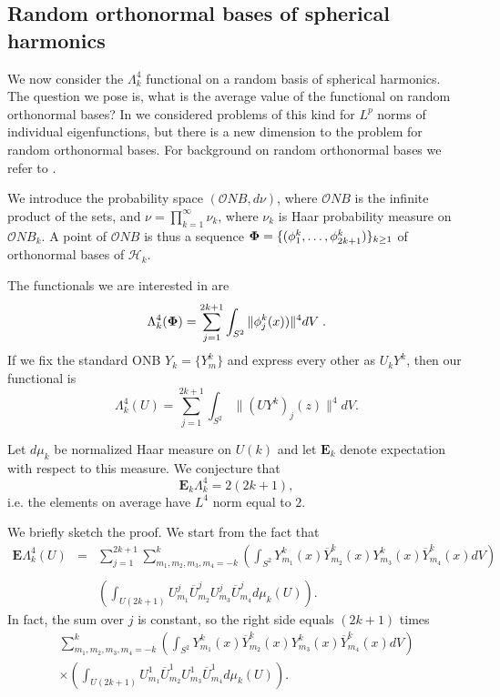 \documentclass[10pt]{amsart}
\begin{document}
\subsection{\label{RANDOM} Random orthonormal bases of spherical harmonics}

We now consider the $\Lambda_k^4$ functional on a random basis of
spherical harmonics. The question we pose is, what is the average
value of the functional on random orthonormal bases? In \cite{SZ}
we considered problems of this kind for $L^p$ norms of individual
eigenfunctions, but there is a new dimension to the problem for
random orthonormal bases. For background on random orthonormal
bases we refer to \cite{SZ}.

 We introduce the probability space
$({\mathcal ONB},d\nu)$, where ${\mathcal ONB}$ is the infinite
product of the sets, and $\nu =\prod_{k=1}^{\infty} \nu_k$, where
$\nu_k$ is Haar probability measure on ${\mathcal ONB}_k$. A point
of ${\mathcal ONB}$ is thus a sequence ${\bf \Phi} = \{(\phi^k_1,
\dots, \phi^k_{2k + 1}) \}_{k\geq 1}$ of orthonormal bases of
${\mathcal H}_k$.

The functionals we are interested in are
\begin{equation}\label{A} \Lambda_{k}^4({\bf \Phi}) = \sum_{j = 1}^{2k+ 1} \int_{S^2} \|\phi^k_j(x))\|^4 dV\;.\end{equation}
If we fix the standard ONB $Y_k =\{Y^k_{m}\}$ and express every
other as $U_k Y^k$, then our functional is
\begin{equation}\label{AU} \Lambda_{k}^4(U) = \sum_{j = 1}^{2k + 1} \int_{S^2} \| (UY^k)_j(z)\|^4 dV.\end{equation}

Let $d\mu_k$ be normalized Haar measure on $U(k)$ and let ${{\mathbf E}}_k$
denote expectation with respect to this measure. We conjecture
that \begin{equation} \label{CONJ} {{\mathbf E}}_k \Lambda_k^4 =  2 (2 k +
1),
\end{equation}
i.e. the elements on average have $L^4$ norm equal to $2$.

We briefly sketch the proof.  We start from the fact that
\begin{equation}\label{AUa} \begin{array}{lll} {{\mathbf E}} \Lambda_{k}^4(U) &= & \sum_{j = 1}^{2k + 1} \sum_{m_1, m_2, m_3, m_4 = -
k}^k \left(\int_{S^2} Y^k_{m_1}(x) \overline{Y}^k_{m_2}(x)
Y^k_{m_3}(x) \overline{Y}^k_{m_4}(x) dV \right)\\ && \\ &&
\left(\int_{U(2k + 1)} U^j_{m_1} \overline{U}^j_{m_2} U^j_{m_3}
\overline{U}^j_{m_4} d\mu_k(U) \right). \end{array}
\end{equation}
In fact, the sum over $j$ is constant, so the right side equals
$(2k + 1)$ times
\begin{multline*} \sum_{m_1, m_2, m_3, m_4 = -
k}^k \left(\int_{S^2} Y^k_{m_1}(x) \overline{Y}^k_{m_2}(x)
Y^k_{m_3}(x) \overline{Y}^k_{m_4}(x) dV \right)
\\
 \times \left(\int_{U(2k +
1)} U^1_{m_1} \overline{U}^1_{m_2} U^1_{m_3} \overline{U}^1_{m_4}
d\mu_k(U) \right).  \end{multline*}
\end{document}
